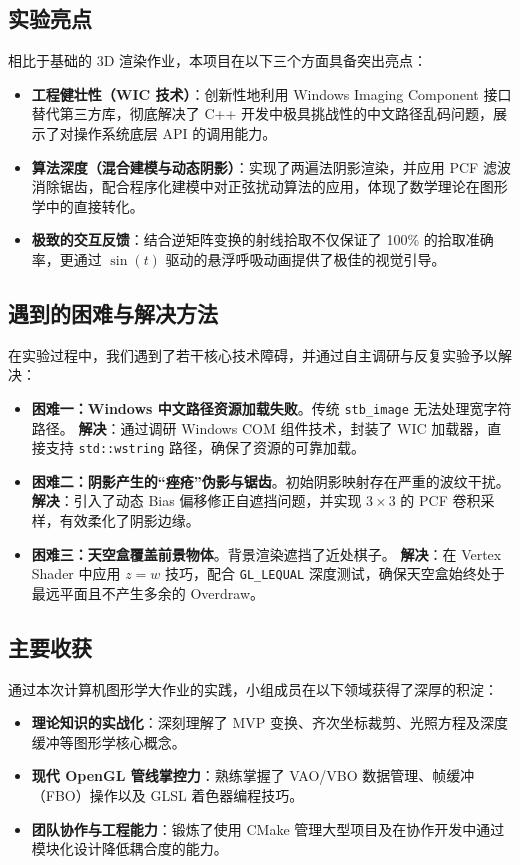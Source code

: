 \documentclass[a4paper]{article}
\begin{document}
\subsection{实验亮点}
相比于基础的 3D 渲染作业，本项目在以下三个方面具备突出亮点：
\begin{itemize}
    \item \textbf{工程健壮性（WIC 技术）}：创新性地利用 Windows Imaging Component 接口替代第三方库，彻底解决了 C++ 开发中极具挑战性的中文路径乱码问题，展示了对操作系统底层 API 的调用能力。
    \item \textbf{算法深度（混合建模与动态阴影）}：实现了两遍法阴影渲染，并应用 PCF 滤波消除锯齿，配合程序化建模中对正弦扰动算法的应用，体现了数学理论在图形学中的直接转化。
    \item \textbf{极致的交互反馈}：结合逆矩阵变换的射线拾取不仅保证了 100\% 的拾取准确率，更通过 $\sin(t)$ 驱动的悬浮呼吸动画提供了极佳的视觉引导。
\end{itemize}

\subsection{遇到的困难与解决方法}
在实验过程中，我们遇到了若干核心技术障碍，并通过自主调研与反复实验予以解决：
\begin{itemize}
    \item \textbf{困难一：Windows 中文路径资源加载失败}。传统 \texttt{stb\_image} 无法处理宽字符路径。
    \textbf{解决}：通过调研 Windows COM 组件技术，封装了 WIC 加载器，直接支持 \texttt{std::wstring} 路径，确保了资源的可靠加载。
    \item \textbf{困难二：阴影产生的“痤疮”伪影与锯齿}。初始阴影映射存在严重的波纹干扰。
    \textbf{解决}：引入了动态 Bias 偏移修正自遮挡问题，并实现 $3 \times 3$ 的 PCF 卷积采样，有效柔化了阴影边缘。
    \item \textbf{困难三：天空盒覆盖前景物体}。背景渲染遮挡了近处棋子。
    \textbf{解决}：在 Vertex Shader 中应用 $z=w$ 技巧，配合 \texttt{GL\_LEQUAL} 深度测试，确保天空盒始终处于最远平面且不产生多余的 Overdraw。
\end{itemize}

\subsection{主要收获}
通过本次计算机图形学大作业的实践，小组成员在以下领域获得了深厚的积淀：
\begin{itemize}
    \item \textbf{理论知识的实战化}：深刻理解了 MVP 变换、齐次坐标裁剪、光照方程及深度缓冲等图形学核心概念。
    \item \textbf{现代 OpenGL 管线掌控力}：熟练掌握了 VAO/VBO 数据管理、帧缓冲（FBO）操作以及 GLSL 着色器编程技巧。
    \item \textbf{团队协作与工程能力}：锻炼了使用 CMake 管理大型项目及在协作开发中通过模块化设计降低耦合度的能力。
\end{itemize}
\end{document}

